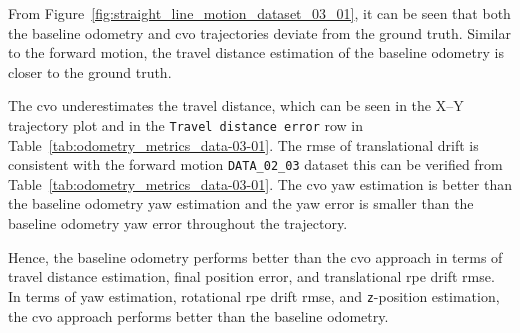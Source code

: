 \documentclass[report.tex]{subfiles}
\begin{document}



    From Figure~\ref{fig:straight_line_motion_dataset_03_01}, it can be seen that both the baseline odometry and \gls{cvo} trajectories deviate from the ground truth. Similar to the forward motion, the travel distance estimation of the baseline odometry is closer to the ground truth.

    The \gls{cvo} underestimates the travel distance, which can be seen in the X--Y trajectory plot and in the \texttt{Travel distance error} row in Table~\ref{tab:odometry_metrics_data-03-01}. The \gls{rmse} of translational drift is consistent with the forward motion \texttt{DATA\_02\_03} dataset this can be verified from  Table~\ref{tab:odometry_metrics_data-03-01}. The \gls{cvo} yaw estimation is better than the baseline odometry yaw estimation and the yaw error is smaller than the baseline odometry yaw error throughout the trajectory. 
  
    Hence, the baseline odometry performs better than the \gls{cvo} approach in terms of travel distance estimation, final position error, and translational \gls{rpe} drift \gls{rmse}. In terms of yaw estimation, rotational \gls{rpe} drift \gls{rmse}, and \texttt{z}-position estimation, the \gls{cvo} approach performs better than the baseline odometry.
    \FloatBarrier
\end{document}
